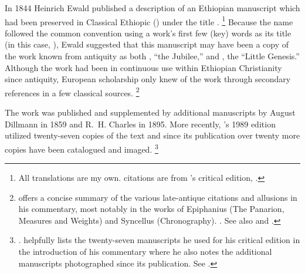 

\nocite{ewald_zkm1844}
In 1844 Heinrich Ewald published a description of an Ethiopian manuscript which had been preserved in Classical Ethiopic (\geez) under the title .%
\footnote{All translations are my own. \geez citations are from \vanderkam's critical edition, \cite*{vanderkam1989}.}
Because the name followed the common convention using a work's first few (key) words as its title (in this case, ), Ewald suggested that this manuscript may have been a copy of the work known from antiquity as both , ``the Jubilee,'' and , the ``Little Genesis.''\autocite[176--179]{ewald_zkm1844} Although the work had been in continuous use within Ethiopian Christianity since antiquity, European scholarship only knew of the work through secondary references in a few classical sources.%
\footnote{\vanderkam offers a concise summary of the various late-antique citations and allusions in his commentary, most notably in the works of Epiphanius (The Panarion, Measures and Weights) and Syncellus (Chronography). \cite[1:10--14]{vanderkam2018}. See also \cite{reed_kister-etal2015} and \cite{kreps_ch2018}.%
}%

The work was published and supplemented by additional manuscripts by August Dillmann in 1859\autocite{dillmann1859} and R.~H. Charles in 1895.\autocite{charles1895} More recently, \vanderkam's 1989 edition utilized twenty-seven copies of the text\autocite[1:xiv--xvi]{vanderkam1989} and since its publication over twenty more copies have been catalogued and imaged.%
%
\footnote{%
\cite{erho_bsoas2013}.
\vanderkam helpfully lists the twenty-seven manuscripts he used for his critical edition in the introduction of his commentary where he also notes the additional manuscripts photographed since its publication. See \cite[1:14--16]{vanderkam2018}.
}

